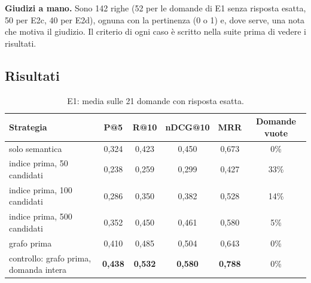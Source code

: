 \documentclass[11pt,a4paper]{article}
\begin{document}
\textbf{Giudizi a mano.} Sono 142 righe (52 per le domande di E1 senza risposta esatta, 50 per E2c, 40 per E2d), ognuna con la pertinenza (0 o 1) e, dove serve, una nota che motiva il giudizio. Il criterio di ogni caso è scritto nella suite prima di vedere i risultati.

\subsection{Risultati}
\begin{table}[!htb]
\centering\small
\begin{tabular}{@{}l c c c c c@{}}
\toprule
\textbf{Strategia} & \textbf{P@5} & \textbf{R@10} & \textbf{nDCG@10} & \textbf{MRR} & \textbf{Domande vuote} \\
\midrule
solo semantica & 0,324 & 0,423 & 0,450 & 0,673 & 0\% \\
indice prima, 50 candidati & 0,238 & 0,259 & 0,299 & 0,427 & 33\% \\
indice prima, 100 candidati & 0,286 & 0,350 & 0,382 & 0,528 & 14\% \\
indice prima, 500 candidati & 0,352 & 0,450 & 0,461 & 0,580 & 5\% \\
grafo prima & 0,410 & 0,485 & 0,504 & 0,643 & 0\% \\
controllo: grafo prima, domanda intera & \textbf{0,438} & \textbf{0,532} & \textbf{0,580} & \textbf{0,788} & 0\% \\
\bottomrule
\end{tabular}
\caption{E1: media sulle 21 domande con risposta esatta.}
\label{tab:e1}
\end{table}
\end{document}
